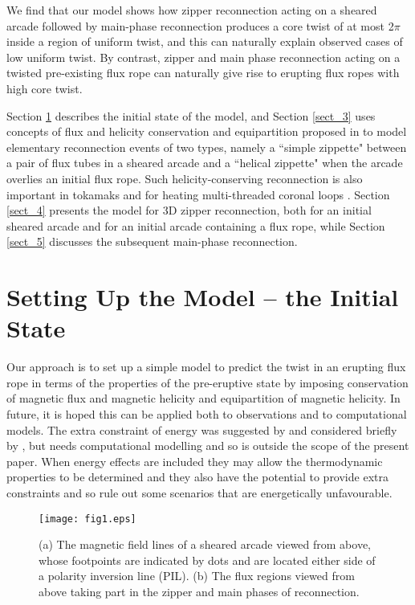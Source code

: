 \documentclass[10pt,namedreferneces]{SolarPhysics}
\begin{document}
\begin{article}
We find that our model shows how zipper reconnection acting on a sheared arcade followed by main-phase reconnection produces a core twist of at most 2$\pi$ inside a region of uniform twist, and this can naturally explain observed cases of low uniform twist.  By contrast, zipper and main phase reconnection acting on a  twisted pre-existing flux rope can naturally give rise to erupting flux ropes with high core twist. 

Section \ref{sect_2} describes the initial state of the model, and Section \ref{sect_3} uses concepts of flux and helicity conservation and equipartition proposed in  to model elementary reconnection events of two types, namely a ``simple zippette" between a pair of flux tubes in a sheared arcade and a ``helical zippette" when the arcade overlies an initial flux rope. Such helicity-conserving reconnection is also important in tokamaks and for heating  multi-threaded coronal loops \cite{browning16a,hood16a}. Section \ref{sect_4}  presents the model for 3D zipper reconnection, 
both for an initial sheared arcade and for an initial arcade containing a flux rope,
while Section \ref{sect_5} discusses the subsequent  main-phase reconnection.

\section{Setting Up the Model -- the Initial State} 
\label{sect_2}

Our approach is to set up a simple model to predict the twist in an erupting flux rope in terms of the properties of the pre-eruptive state by imposing conservation of magnetic flux and magnetic helicity and equipartition of magnetic helicity.  In future, it is hoped this can be applied both to observations and to computational models. The extra constraint of energy was suggested by  and considered briefly by , but needs computational modelling and so is outside the scope of the present paper.
When energy effects are included they may allow the thermodynamic properties to be determined and they also have the potential to provide extra constraints and so rule out some scenarios that are energetically unfavourable.
\begin{figure}[h]
{\centering
 \texttt{[image: fig1.eps]}
\caption{(a) The magnetic field lines of a sheared arcade viewed from above, whose footpoints are indicated by dots and are located either side of a polarity inversion line (PIL). (b) The flux regions viewed from above taking part in the zipper and main phases of reconnection.}
\label{fig1}}
\end{figure}



\end{article}
\end{document}
